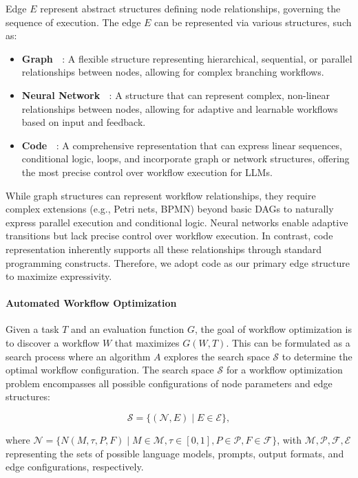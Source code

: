 Edge \( E \) represent abstract structures defining node relationships, governing the sequence of execution. The edge \( E \) can be represented via various structures, such as:

\begin{itemize}[leftmargin=20pt]
    \item \textbf{Graph ~\cite{zhuge2024gptswarm}}: A flexible structure representing hierarchical, sequential, or parallel relationships between nodes, allowing for complex branching workflows.
    \item \textbf{Neural Network ~\citep{liu2023dynamic}}: A structure that can represent complex, non-linear relationships between nodes, allowing for adaptive and learnable workflows based on input and feedback.
    \item \textbf{Code ~\citep{hu2024automated}}: A comprehensive representation that can express linear sequences, conditional logic, loops, and incorporate graph or network structures, offering the most precise control over workflow execution for LLMs.
\end{itemize}

While graph structures can represent workflow relationships, they require complex extensions (e.g., Petri nets, BPMN) beyond basic DAGs to naturally express parallel execution and conditional logic. Neural networks enable adaptive transitions but lack precise control over workflow execution. In contrast, code representation inherently supports all these relationships through standard programming constructs. Therefore, we adopt code as our primary edge structure to maximize expressivity.

\paragraph{Automated Workflow Optimization}
Given a task \( T \) and an evaluation function \( G \), the goal of workflow optimization is to discover a workflow \( W \) that maximizes \( G(W, T) \). This can be formulated as a search process where an algorithm \( A \) explores the search space \( \mathcal{S} \) to determine the optimal workflow configuration.
The search space \( \mathcal{S} \) for a workflow optimization problem encompasses all possible configurations of node parameters and edge structures:

\[
\mathcal{S} = \{ (\mathcal{N}, E) \mid  E \in \mathcal{E} \},
\]

where \( \mathcal{N} = \{ N(M, \tau, P, F) \mid M \in \mathcal{M}, \tau \in [0,1], P \in \mathcal{P}, F \in \mathcal{F} \} \), with \( \mathcal{M}, \mathcal{P}, \mathcal{F}, \mathcal{E} \) representing the sets of possible language models, prompts, output formats, and edge configurations, respectively.

